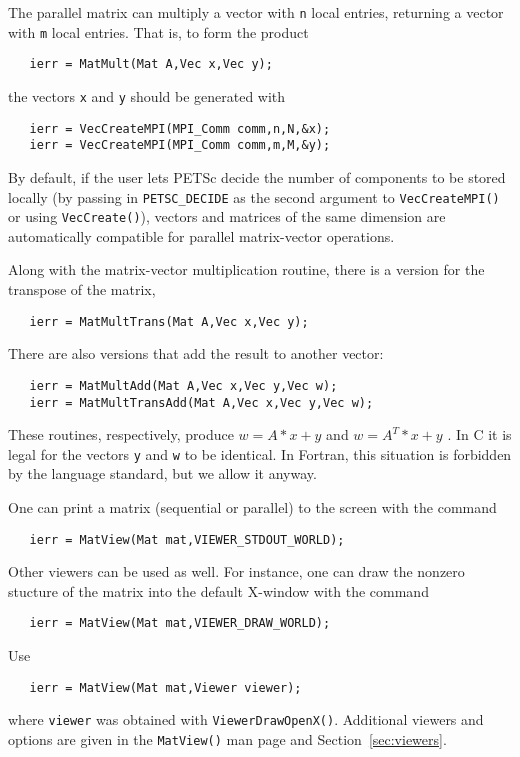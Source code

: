 The parallel matrix can multiply a vector with {\tt n} 
local entries, returning a vector with {\tt m} local entries. That is, 
to form the product 
\begin{verbatim}
   ierr = MatMult(Mat A,Vec x,Vec y);
\end{verbatim}
the vectors {\tt x} and {\tt y} should be generated with 
\begin{verbatim}
   ierr = VecCreateMPI(MPI_Comm comm,n,N,&x);
   ierr = VecCreateMPI(MPI_Comm comm,m,M,&y);
\end{verbatim}
By default, if the user lets PETSc decide the number of components to
be stored locally (by passing in {\tt PETSC\_DECIDE} as the second
argument to {\tt VecCreateMPI()} or using {\tt VecCreate()}), vectors
and matrices of the same dimension are automatically compatible for
parallel matrix-vector operations.

Along with the matrix-vector multiplication routine, there is 
a version for the transpose of the matrix, 
\begin{verbatim}
   ierr = MatMultTrans(Mat A,Vec x,Vec y);
\end{verbatim}
There are also versions that add the result
to another vector:  
\begin{verbatim}
   ierr = MatMultAdd(Mat A,Vec x,Vec y,Vec w);
   ierr = MatMultTransAdd(Mat A,Vec x,Vec y,Vec w);
\end{verbatim}
These routines, respectively, produce $ w = A*x + y $ and $ w = A^{T}*x + y$ . 
In C it is legal for the vectors {\tt y} and {\tt w} to be identical.
In Fortran, this situation is forbidden by the language standard, 
but we allow it anyway.

One can print a matrix (sequential or parallel) to the screen with the 
command 
\begin{verbatim}
   ierr = MatView(Mat mat,VIEWER_STDOUT_WORLD);
\end{verbatim}
Other viewers can be used as well. For instance, one can draw the
nonzero stucture of the matrix into the default X-window with the 
command 
\begin{verbatim}
   ierr = MatView(Mat mat,VIEWER_DRAW_WORLD);
\end{verbatim}
Use 
\begin{verbatim}
   ierr = MatView(Mat mat,Viewer viewer);
\end{verbatim}
where {\tt viewer} was obtained with {\tt ViewerDrawOpenX()}.
Additional viewers  and options are given in the {\tt MatView()} man
page and Section~\ref{sec:viewers}.

